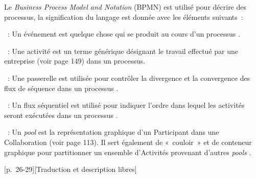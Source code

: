 Le \textit{Business Process Model and Notation} (BPMN) est utilisé pour décrire des processus, la signification du langage est donnée avec les éléments suivants~:
{
\item [][--- définition d'un événement]~: Un événement est quelque chose qui se produit au cours d'un processus \elide.
\item [][--- définition d'activité]~: Une activité est un terme générique désignant le travail effectué par une entreprise (voir page 149) dans un processus.
\item [][--- définition d'une passerelle]~: Une passerelle est utilisée pour contrôler la divergence et la convergence des flux de séquence dans un processus \elide.
\item [][--- définition d'un flux séquentiel]~: Un flux séquentiel est utilisé pour indiquer l'ordre dans lequel les activités seront exécutées dans un processus \elide.
\item [][--- définition d'un \textit{pool}]~: Un \textit{pool} est la représentation graphique d'un Participant dans une Collaboration (voir page 113). Il sert également de «~couloir~» et de conteneur graphique pour partitionner un ensemble d'Activités provenant d'autres \textit{pools} \elide.
\item [][--- l'expression de cercle avec un contour mince représente un événement de départ;]
\item [][--- l'expression de cercle avec un contour épais représente un événement d'arrivée;]
\item [][--- l'expression de flèche représente un flux séquentiel;]
\item [][--- l'expression de rectangle représente une activité; ]
\item [][--- l'expression de losange ayant un symbole \emphase{X} à l'intérieur représente une porte de type exclusif;]
\item [][--- l'expression de losange ayant un symbole \emphase{+} à l'intérieur représente une porte de type parallèle;]
\item [][--- l'expression de boîte représente le \textit{pool}.]
}
{[p.~26-29]}{[Traduction et description libres]}